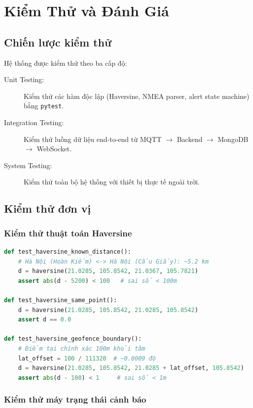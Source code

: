 \chapter{Kiểm Thử và Đánh Giá}

\section{Chiến lược kiểm thử}

Hệ thống được kiểm thử theo ba cấp độ:

\begin{description}
  \item[Unit Testing:] Kiểm thử các hàm độc lập (Haversine, NMEA parser, alert state machine) bằng \texttt{pytest}.
  \item[Integration Testing:] Kiểm thử luồng dữ liệu end-to-end từ MQTT $\rightarrow$ Backend $\rightarrow$ MongoDB $\rightarrow$ WebSocket.
  \item[System Testing:] Kiểm thử toàn bộ hệ thống với thiết bị thực tế ngoài trời.
\end{description}

\section{Kiểm thử đơn vị}

\subsection{Kiểm thử thuật toán Haversine}

\begin{lstlisting}[language=python, caption=Unit test thuật toán Haversine]
def test_haversine_known_distance():
    # Hà Nội (Hoàn Kiếm) <-> Hà Nội (Cầu Giấy): ~5.2 km
    d = haversine(21.0285, 105.8542, 21.0367, 105.7821)
    assert abs(d - 5200) < 100   # sai số < 100m

def test_haversine_same_point():
    d = haversine(21.0285, 105.8542, 21.0285, 105.8542)
    assert d == 0.0

def test_haversine_geofence_boundary():
    # Điểm tại chính xác 100m khỏi tâm
    lat_offset = 100 / 111320  # ~0.0009 độ
    d = haversine(21.0285, 105.8542, 21.0285 + lat_offset, 105.8542)
    assert abs(d - 100) < 1     # sai số < 1m
\end{lstlisting}

\subsection{Kiểm thử máy trạng thái cảnh báo}

